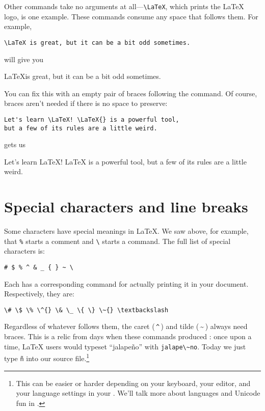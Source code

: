 Other commands take no arguments at all---\verb|\LaTeX|,
which prints the \LaTeX{} logo, is one example.
These commands consume any space that follows them.
For example,
\begin{leftfigure}
\begin{lstlisting}
\LaTeX is great, but it can be a bit odd sometimes.
\end{lstlisting}
\end{leftfigure}
will give you
\begin{leftfigure}
\lm \LaTeX is great, but it can be a bit odd sometimes.
\end{leftfigure}
You can fix this with an empty pair of braces following the command.
Of course, braces aren't needed if there is no space to preserve:
\begin{leftfigure}
\begin{lstlisting}
Let's learn \LaTeX! \LaTeX{} is a powerful tool,
but a few of its rules are a little weird.
\end{lstlisting}
\end{leftfigure}
gets us
\begin{leftfigure}
\lm Let's learn \LaTeX! \LaTeX{} is a powerful tool,
but a few of its rules are a little weird.
\end{leftfigure}

\section{Special characters and line breaks}

Some characters have special meanings in \LaTeX.
We saw above, for example, that \verb|%| starts a comment
and \verb|\| starts a command.
The full list of special characters is:
\begin{leftfigure}
\begin{lstlisting}
# $ % ^ & _ { } ~ \
\end{lstlisting}
\end{leftfigure}
Each has a corresponding command
for actually printing it in your document. Respectively, they are:
\begin{leftfigure}
\begin{lstlisting}
\# \$ \% \^{} \& \_ \{ \} \~{} \textbackslash
\end{lstlisting}
\end{leftfigure}
Regardless of whatever follows them,
the caret (\,\texttt{\^{}}\,) and tilde (\,\~{}\,) always need braces.
This is a relic from days when these commands produced
:
once upon a time, \LaTeX{} users would typeset ``jalapeño'' with
\verb|jalape\~no|.
Today we just type \texttt{ñ} into our source
file.\punckern\footnote{This can be easier or harder depending
on your keyboard, your editor, and your language settings in your .
We'll talk more about languages and Unicode fun in .}


